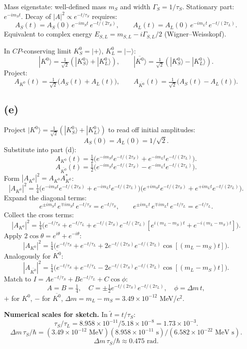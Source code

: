 \documentclass[11pt]{article}
\newcommand{\Kz}{K^{0}}
\newcommand{\Kbar}{\overline{K^{0}}}
\begin{document}
Mass eigenstate: well-defined mass $m_S$ and width $\Gamma_S = 1/\tau_S$. Stationary part: $e^{-i m_S t}$. Decay of $|A|^2\propto e^{-t/\tau_S}$ requires:
\[ \boxed{\;A_S(t) = A_S(0)\,e^{-i m_S t}\,e^{-t/(2\tau_S)},\qquad A_L(t) = A_L(0)\,e^{-i m_L t}\,e^{-t/(2\tau_L)}.\;} \]
Equivalent to complex energy $E_{S,L} = m_{S,L} - i\Gamma_{S,L}/2$ (Wigner--Weisskopf).

In $CP$-conserving limit $K^0_S = |+\rangle$, $K^0_L = |-\rangle$:
\[ |\Kz\rangle = \tfrac{1}{\sqrt2}(|K^0_S\rangle + |K^0_L\rangle),\qquad |\Kbar\rangle = \tfrac{1}{\sqrt2}(|K^0_S\rangle - |K^0_L\rangle). \]
Project:
\[ \boxed{\;A_{\Kz}(t) = \tfrac{1}{\sqrt 2}\bigl(A_S(t) + A_L(t)\bigr),\qquad A_{\Kbar}(t) = \tfrac{1}{\sqrt 2}\bigl(A_S(t) - A_L(t)\bigr).\;} \]

\subsection*{(e)}

Project $|\Kz\rangle = \tfrac{1}{\sqrt2}(|K^0_S\rangle + |K^0_L\rangle)$ to read off initial amplitudes:
\[ A_S(0) = A_L(0) = 1/\sqrt2. \]
Substitute into part (d):
\[ A_{\Kz}(t) = \tfrac{1}{2}\bigl(e^{-im_S t}e^{-t/(2\tau_S)} + e^{-im_L t}e^{-t/(2\tau_L)}\bigr). \]
\[ A_{\Kbar}(t) = \tfrac{1}{2}\bigl(e^{-im_S t}e^{-t/(2\tau_S)} - e^{-im_L t}e^{-t/(2\tau_L)}\bigr). \]
Form $|A_{\Kz}|^2 = A_{\Kz} A_{\Kz}^{*}$:
\[ |A_{\Kz}|^2 = \tfrac{1}{4}\bigl(e^{-im_S t}e^{-t/(2\tau_S)} + e^{-im_L t}e^{-t/(2\tau_L)}\bigr)\bigl(e^{+im_S t}e^{-t/(2\tau_S)} + e^{+im_L t}e^{-t/(2\tau_L)}\bigr). \]
Expand the diagonal terms:
\[ e^{\pm im_S t}\,e^{\mp im_S t}\,e^{-t/\tau_S} = e^{-t/\tau_S},\qquad e^{\pm im_L t}\,e^{\mp im_L t}\,e^{-t/\tau_L} = e^{-t/\tau_L}. \]
Collect the cross terms:
\[ |A_{\Kz}|^2 = \tfrac{1}{4}\bigl(e^{-t/\tau_S} + e^{-t/\tau_L} + e^{-t/(2\tau_S)}e^{-t/(2\tau_L)}[e^{i(m_L-m_S)t}+e^{-i(m_L-m_S)t}]\bigr). \]
Apply $2\cos\theta = e^{i\theta}+e^{-i\theta}$:
\[ |A_{\Kz}|^2 = \tfrac{1}{4}\bigl(e^{-t/\tau_S} + e^{-t/\tau_L} + 2 e^{-t/(2\tau_S)}e^{-t/(2\tau_L)}\cos[(m_L-m_S)t]\bigr). \]
Analogously for $\Kbar$:
\[ |A_{\Kbar}|^2 = \tfrac{1}{4}\bigl(e^{-t/\tau_S} + e^{-t/\tau_L} - 2 e^{-t/(2\tau_S)}e^{-t/(2\tau_L)}\cos[(m_L-m_S)t]\bigr). \]
Match to $I = A e^{-t/\tau_S} + B e^{-t/\tau_L} + C\cos\phi$:
\[ \boxed{\;A = B = \tfrac14,\quad C = \pm \tfrac12 e^{-t/(2\tau_S)} e^{-t/(2\tau_L)},\quad \phi = \Delta m\, t,\;} \]
$+$ for $\Kz$, $-$ for $\Kbar$, $\Delta m = m_L - m_S = 3.49\times 10^{-12}$ MeV/$c^2$.

\textbf{Numerical scales for sketch.} In $\tilde t = t/\tau_S$:
\[ \tau_S/\tau_L = 8.958\times 10^{-11}/5.18\times 10^{-8} = 1.73\times 10^{-3}. \]
\[ \Delta m \,\tau_S /\hbar = (3.49\times 10^{-12}\text{ MeV})(8.958\times 10^{-11}\text{ s})/(6.582\times 10^{-22}\text{ MeV s}). \]
\[ \Delta m \,\tau_S /\hbar \approx 0.475\text{ rad}. \]
\end{document}
